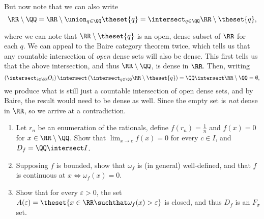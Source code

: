 \begin{solution}
\begin{enumerate}
  But now note that we can also write
  $$
  \RR \setminus \QQ = \RR \setminus \union_{q\in \QQ} \theset{q} = \intersect_{q\in\QQ} \RR\setminus \theset{q},
  $$

  where we can note that $\RR\setminus\theset{q}$ is an open, dense subset of $\RR$ for each $q$. We can appeal to the Baire category theorem twice, which tells us that any countable intersection of \textit{open} dense sets will also be dense. This first tells us that the above intersection, and thus $\RR\setminus\QQ$, is dense in $\RR$. Then, writing
  $$
  \left(\intersect_{i\in \NN} O_i\right) \intersect \left(\intersect_{q\in\QQ} \RR\setminus\theset{q}\right) = \QQ \intersect \RR\setminus\QQ = \emptyset,
  $$
  we produce what is still just a countable intersection of open dense sets, and by Baire, the result would need to be dense as well. Since the empty set is \textit{not} dense in $\RR$, so we arrive at a contradiction.
\end{enumerate}
\end{solution}

\begin{problem}\hfill
\begin{enumerate}
  \item Let $r_n$ be an enumeration of the rationals, define $f(r_n) = \frac 1 n$ and $f(x) = 0$ for $x \in \RR\setminus\QQ$. Show that $\lim_{x \to c} f(x) = 0$ for every $c\in I$, and $D_f = \QQ \intersect I$.

  \item Supposing $f$ is bounded, show that $\omega_f$ is (in general) well-defined, and that $f$ is continuous at $x \iff \omega_f(x) = 0$.

  \item Show that for every $\varepsilon > 0$, the set
    $A(\varepsilon) = \theset{x\in\RR \suchthat \omega_f(x) > \varepsilon}$ is closed, and thus $D_f$ is an $F_\sigma$ set.
\end{enumerate}
\end{problem}


